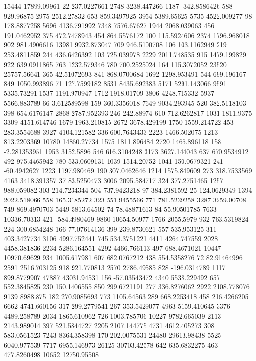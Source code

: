 15444	17899.09961
22	237.0227661
2748	3238.447266
1187	-342.8586426
588	929.96875
2975	2512.27832
653	859.3497925
3954	5389.65625
5735	4522.009277
98	178.8877258
5696	4136.791992
7348	7576.67627
1944	2068.039063
456	191.0462952
375	472.7478943
454	864.5576172
100	115.5924606
2374	1796.968018
902	981.4906616
13981	9932.873047
709	946.5100708
106	103.1162949
219	253.4811859
244	436.6426392
103	725.039978
2229	2011.748535
915	1479.199829
922	639.0911865
763	1232.579346
780	700.2525024
164	115.3072052
23520	25757.56641
365	42.51072693
841	868.0700684
1692	1298.953491
544	699.196167
849	1050.993896
71	127.7599182
8531	8435.692383
5171	5291.143066
9591	5335.73291
1537	1191.970947
1712	1918.01709
3806	4248.715332
5937	5566.883789
66	3.612589598
159	360.3356018
7649	9034.293945
520	382.5118103
398	654.6176147
2868	2787.952393
246	242.88974
610	712.6262817
1031	1811.9375
3309	4151.614746
1679	1963.210815
2672	3678.429199
1750	1559.214722
453	283.3554688
3927	4104.121582
336	600.7643433
2223	1466.502075
1213	813.2203369
10780	14860.27734
1575	1811.896484
2720	1466.896118
158	-2.281353951
1953	3152.5896
546	616.3104248
3173	3627.144043
637	670.9534912
492	975.4465942
780	533.0609131
1039	1514.20752
1041	150.0679321
241	-60.4942627
1223	1197.980469
190	307.0462646
1214	1575.849609
273	318.7533569
4163	3418.391357
37	83.5250473
3006	2095.584717
324	377.2751465
1257	988.059082
303	214.7234344
504	737.9423218
97	384.2381592
25	124.0629349
1394	2022.518066
558	165.3185272
323	551.9455566
771	781.5239258
3287	3259.00708
749	869.4970703
5449	5813.64502
74	78.48871613
84	55.90501785
7633	10336.70313
421	-584.4980469
9860	10654.50977
1766	2055.5979
932	763.5319824
224	300.6854248
166	77.07614136
399	239.8730621
557	535.953125
311	403.3427734
3106	4997.752441
745	534.3751221
4411	4264.747559
2028	4458.381836
2234	5286.164551
4292	4466.766113
497	688.4671021
10447	10970.69629
934	1005.617981
607	682.0767212
438	554.5358276
72	82.91464996
2591	2516.703125
918	921.770813
2570	2786.49585
828	-196.0314789
1117	899.8779907
47887	43031.94531
156	-57.03543472
4340	5538.229492
657	552.3845825
230	150.1406555
850	299.6721191
277	336.8276062
2922	2108.778076
9139	8988.875
182	270.9085693
773	1105.64563
289	668.2253418
458	216.4266205
6662	4741.660156
317	299.2779541
267	353.5429077
4963	5159.410645
3376	4489.258789
2034	1865.610962
726	1003.785706
10227	9782.665039
2113	2143.989014
397	521.5844727
2205	2107.144775
4731	4612.405273
308	583.0561523
7243	8364.358398
170	202.0075531
24480	29613.98438
5525	6040.977539
7717	6955.146973
26125	30703.42578
642	635.6832275
463	477.8260498
10652	12750.95508
